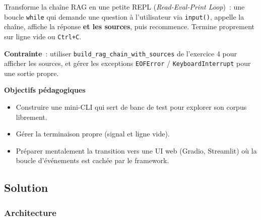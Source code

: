 \documentclass[11pt,a4paper]{article}
\begin{document}
\begin{tcolorbox}[title=Exercice bonus 2. Une boucle while pour explorer la doc librement]
Transforme la chaîne RAG en une petite REPL (\emph{Read-Eval-Print Loop})~:
une boucle \texttt{while} qui demande une question à l'utilisateur via
\texttt{input()}, appelle la chaîne, affiche la réponse \textbf{et les
sources}, puis recommence. Termine proprement sur ligne vide ou
\texttt{Ctrl+C}.

\textbf{Contrainte}~: utiliser \texttt{build\_rag\_chain\_with\_sources}
de l'exercice 4 pour afficher les sources, et gérer les exceptions
\texttt{EOFError} / \texttt{KeyboardInterrupt} pour une sortie propre.

\bigskip
\noindent\textbf{Objectifs pédagogiques}
\begin{itemize}[leftmargin=*]
  \item Construire une mini-CLI qui sert de banc de test pour explorer
        son corpus librement.
  \item Gérer la terminaison propre (signal et ligne vide).
  \item Préparer mentalement la transition vers une UI web (Gradio,
        Streamlit) où la boucle d'événements est cachée par le framework.
\end{itemize}
\end{tcolorbox}

\subsection{Solution}

\subsubsection{Architecture}

\begin{center}
\end{center}
\end{document}
